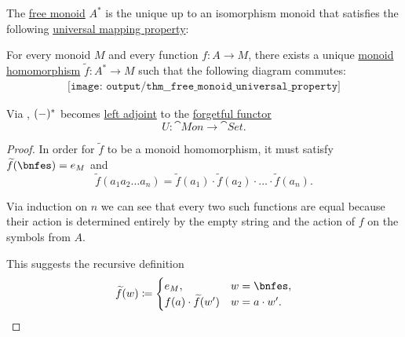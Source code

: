 \begin{theorem}\label{thm:free_monoid_universal_property}
  The \hyperref[def:free_monoid]{free monoid} \( A^* \) is the unique up to an isomorphism monoid that satisfies the following \hyperref[rem:universal_mapping_property]{universal mapping property}:
  \begin{displayquote}
    For every monoid \( M \) and every function \( f: A \to M \), there exists a unique \hyperref[def:monoid/homomorphism]{monoid homomorphism} \( \widetilde{f}: A^* \to M \) such that the following diagram commutes:
    \begin{equation}\label{eq:thm:free_monoid_universal_property/diagram}
      \begin{aligned}
        \texttt{[image: output/thm\_\_free\_monoid\_universal\_property]}
      \end{aligned}
    \end{equation}
  \end{displayquote}
\end{theorem}
\begin{comments}
  \item Via , \( (\Anon*)^* \) becomes \hyperref[def:category_adjunction]{left adjoint} to the \hyperref[def:concrete_category]{forgetful functor}
  \begin{equation*}
    U: \cat{Mon} \to \cat{Set}.
  \end{equation*}
\end{comments}
\begin{proof}
  In order for \( \widetilde{f} \) to be a monoid homomorphism, it must satisfy \( \widetilde{f}(\bnfes) = e_M \) and
  \begin{equation*}
    \widetilde{f}(a_1 a_2 \ldots a_n) = \widetilde{f}(a_1) \cdot \widetilde{f}(a_2) \cdot \ldots \cdot \widetilde{f}(a_n).
  \end{equation*}

  Via induction on \( n \) we can see that every two such functions are equal because their action is determined entirely by the empty string and the action of \( f \) on the symbols from \( A \).

  This suggests the recursive definition
  \begin{equation*}
    \widetilde{f}(w) \coloneqq \begin{cases}
      e_M,                         &w = \bnfes, \\
      f(a) \cdot \widetilde{f}(w') &w = a \cdot w'.
    \end{cases}
  \end{equation*}
\end{proof}

